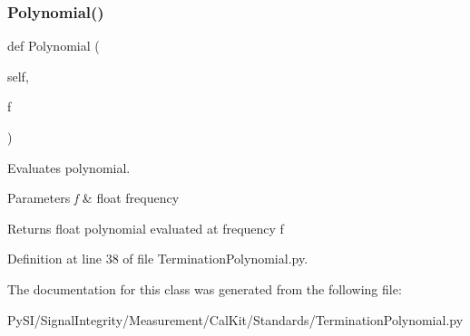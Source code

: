 \subsubsection{\texorpdfstring{Polynomial()}{Polynomial()}}
{\footnotesize\ttfamily def Polynomial (\begin{DoxyParamCaption}\item[{}]{self,  }\item[{}]{f }\end{DoxyParamCaption})}



Evaluates polynomial. 


\begin{DoxyParams}{Parameters}
{\em f} & float frequency \\
\hline
\end{DoxyParams}
\begin{DoxyReturn}{Returns}
float polynomial evaluated at frequency f 
\end{DoxyReturn}


Definition at line 38 of file Termination\+Polynomial.\+py.



The documentation for this class was generated from the following file\+:\begin{DoxyCompactItemize}
\item 
Py\+S\+I/\+Signal\+Integrity/\+Measurement/\+Cal\+Kit/\+Standards/Termination\+Polynomial.\+py\end{DoxyCompactItemize}
